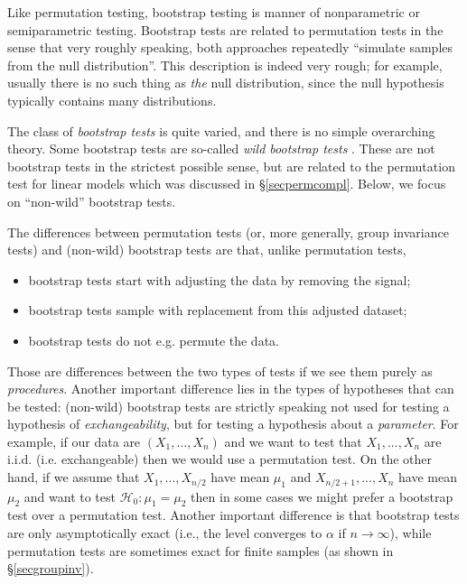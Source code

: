 \documentclass[11pt]{article}
\theoremstyle{plain}
\theoremstyle{definition}
\newcommand{\Hy}{\mathcal{H}}
\newcommand{\citp}{\citep}
\begin{document}
Like permutation testing, 
bootstrap testing is manner of nonparametric or semiparametric testing. Bootstrap tests are related to permutation tests in the sense that very roughly speaking, both approaches repeatedly ``simulate samples from the null distribution''. This description is indeed very rough; for example, usually there is no such thing as \emph{the} null distribution, since the null hypothesis typically contains many distributions.



The class of \emph{bootstrap tests} is quite varied, and there is no simple overarching theory. Some bootstrap tests are so-called \emph{wild bootstrap tests} \citp{davidson2008wild,dikta2021bootstrap}. These are not bootstrap tests in the strictest possible sense, but are  related to the permutation test for linear models which was discussed in \S\ref{secpermcompl}. Below, we focus on ``non-wild'' bootstrap tests.

The differences between permutation tests (or, more generally, group invariance tests) and (non-wild) bootstrap tests are that, unlike permutation tests,
\begin{itemize}
\item bootstrap tests start with adjusting the data by removing the signal;
\item  bootstrap tests sample with replacement from this adjusted dataset; 
\item  bootstrap tests do not e.g. permute the data.
\end{itemize}
Those are differences between the two types of tests if we see them purely as \emph{procedures}. Another important difference lies in the types of hypotheses that can be tested: (non-wild) bootstrap tests are strictly speaking not used for testing a hypothesis of \emph{exchangeability}, but for testing a hypothesis about a \emph{parameter}. For example, if our data are $(X_1,...,X_n)$ and we want to test that $X_1,...,X_n$ are i.i.d. (i.e. exchangeable) then we would use a permutation test. On the other hand, if we assume that $X_1,...,X_{n/2}$ have mean $\mu_1$ and $X_{n/2+1},...,X_{n}$ have mean $\mu_2$ and want to test $\Hy_0:\mu_1=\mu_2$ then in some cases we might prefer a bootstrap test over a permutation test. Another important difference is that bootstrap tests are only asymptotically exact (i.e., the level converges to $\alpha$ if $n\rightarrow\infty$), while permutation tests are sometimes  exact for finite samples (as shown in \S\ref{secgroupinv}).
\end{document}
